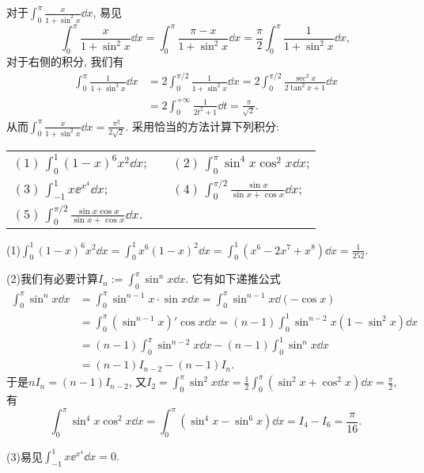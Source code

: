 \begin{quiza}
对于\(\int_{0}^{\pi}\frac{x}{1+\sin^2 x}\dd x\), 易见\[\int_{0}^{\pi}\frac{x}{1+\sin^2x}\dd x=\int_{0}^{\pi}\frac{\pi-x}{1+\sin^2x}\dd x=\frac{\pi}{2}\int_{0}^{\pi}\frac{1}{1+\sin^2x}\dd x,\]对于右侧的积分, 我们有\[\begin{split}
\int_{0}^{\pi}\frac{1}{1+\sin^2x}\dd x&=2\int_{0}^{\pi/2}\frac{1}{1+\sin^2x}\dd x=2\int_{0}^{\pi/2}\frac{\sec^2x}{2\tan^2x+1}\dd x\\&=2\int_{0}^{+\infty}\frac{1}{2t^2+1}\dd t=\frac{\pi}{\sqrt{2}}.
\end{split}\]从而\(\int_{0}^{\pi}\frac{x}{1+\sin^2 x}\dd x=\frac{\pi^2}{2\sqrt{2}}\).
\tcbline
\woe 采用恰当的方法计算下列积分:\vspace{8pt}\\
\begin{tabular}{lcl}
\((1)\,\int_{0}^{1}(1-x)^6x^2\dd x\);&\qquad\qquad\qquad&\((2)\,\int_{0}^{\pi}\sin^4x\cos^2x\dd x\);\vspace{0.3cm}\\
\((3)\,\int_{-1}^{1}x\ee^{x^4}\dd x\);&&\((4)\,\int_{0}^{\pi/2}\frac{\sin x}{\sin x+\cos x}\dd x\);\vspace{0.3cm}\\
\((5)\,\int_{0}^{\pi/2}\frac{\sin x\cos x}{\sin x+\cos x}\dd x\).&&\vspace{0.3cm}\\
\end{tabular}
\begin{solution}
(1)\(\int_{0}^{1}(1-x)^6x^2\dd x=\int_{0}^{1}x^6(1-x)^2\dd x=\int_{0}^{1}\left(x^6-2x^7+x^8\right)\dd x=\frac{1}{252}\).

(2)我们有必要计算\(I_n:=\int_0^\pi \sin^nx\dd x\). 它有如下递推公式\[\begin{split}
\int_0^\pi \sin^nx\dd x&=\int_{0}^{\pi}\sin^{n-1}x\cdot\sin x\dd x=\int_{0}^{\pi}\sin^{n-1}x\dd\left(-\cos x\right)\\&=\int_{0}^{\pi}\left(\sin^{n-1}x\right)'\cos x\dd x=(n-1)\int_{0}^{1}\sin^{n-2}x\left(1-\sin^2x\right)\dd x\\&=(n-1)\int_{0}^{\pi}\sin^{n-2}x\dd x-(n-1)\int_{0}^{1}\sin^nx\dd x\\&=(n-1)I_{n-2}-(n-1)I_n.
\end{split}\]于是\(nI_n=(n-1)I_{n-2}\), 又\(I_2=\int_{0}^{\pi}\sin^2x\dd x=\frac{1}{2}\int_{0}^{\pi}(\sin^2x+\cos^2x)\dd x=\frac{\pi}{2}\), 有\[\int_{0}^{\pi}\sin^4x\cos^2x\dd x=\int_{0}^{\pi}\left(\sin^4x-\sin^6x\right)\dd x=I_4-I_6=\frac{\pi}{16}.\]

(3)易见\(\int_{-1}^{1}x\ee^{x^4}\dd x=0.\)


\end{solution}
\end{quiza}

